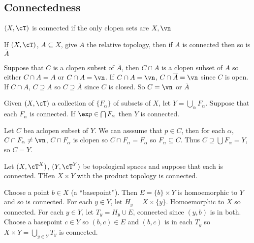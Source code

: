 
\subsection{Connectedness}

$(X, \cT)$ is connected if the only clopen sets are $X, \vn$

\begin{proposition}
    If $(X, \cT)$, $A \subseteq X$, give $A$ the relative topology, then if $A$ is connected then so is $\overline{A}$ 
\end{proposition}

\begin{pf}
    Suppose that $C$ is a clopen subset of $\overline{A}$, then $C \cap A$ is a clopen subset of $A$ so either $C \cap A  =A$ or $C \cap A = \vn$. If $C \cap A = \vn$, $C \cap \overline{A} = \vn$ since $C$ is open. If $C \cap A$, $C \supseteq A$ so $C \supseteq \overline{A}$ since $C$ is closed. So $C  = \vn$ or $\overline{A}$  
\end{pf}

\begin{proposition}
    Given $(X, \cT)$ a collection of $\{F_{\alpha}\}$ of subsets of $X$, let $Y = \bigcup_{\alpha}F_{\alpha}$. Suppose that each $F_{\alpha}$ is connected. If $\ex p \in \bigcap F_{\alpha}$ then $Y$ is connected.  
\end{proposition}

\begin{pf}
    Let $C$ bea  aclopen subset of $Y$. We can asssume that $p \in C$, then for each $\alpha$, $C \cap F_{\alpha} \neq \vn$, $C \cap F_{\alpha}$ is clopen so $C \cap F_{\alpha} = F_{\alpha}$ so $F_{\alpha} \subseteq C$. Thus $C \supseteq \bigcup F_{\alpha} = Y$, so $C=Y$. 
\end{pf}

\begin{proposition}
    Let $(X,\cT^X)$, $(Y, \cT^Y)$ be topological spaces and suppose that each is connected. THen $X \times Y$ with the product topology is connected. 
\end{proposition}

\begin{pf}
    Choose a point $b \in X$ (a ``basepoint''). Then $E = \{b\} \times Y$ is homoemorphic to $Y$ and so is connected. For each $y \in Y$, let $H_y = X \times \{y\}$. Homoemorphic to $X$ so connected. For each $y \in Y$, let $T_y = H_y \cup E$, connected since $(y,b)$ is in both. Choose a basepoint $c \in Y$ so $(b,c) \in E$ and $(b,c)$ is in each $T_y$ so $X \times Y = \bigcup_{y \in Y}T_y$ is connected. 
\end{pf}

